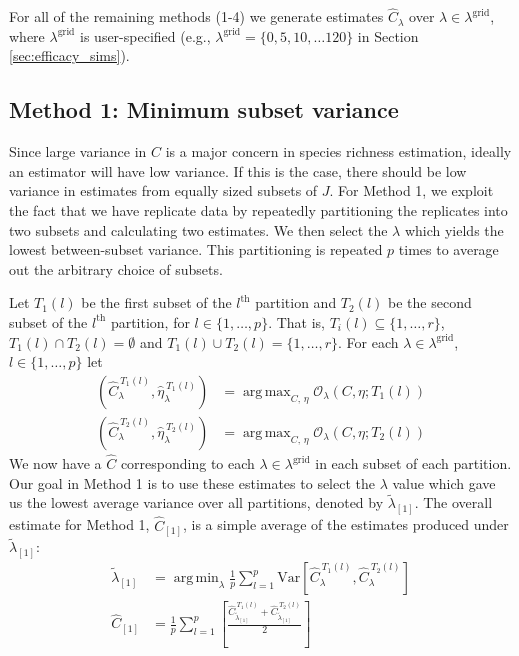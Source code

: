 \documentclass[12pt]{article}
\DeclareMathOperator*{\argmin}{arg\,min}
\DeclareMathOperator*{\argmax}{arg\,max}
\newcommand{\lambdagrid}{\lambda^{\text{grid}}}
\begin{document}
For all of the remaining methods (1-4) we generate estimates $\widehat{C}_\lambda$ over $\lambda \in \lambda^{\text{grid}}$, where $\lambdagrid$ is user-specified (e.g., $\lambdagrid = \{0, 5, 10, \dots 120\}$ in Section \ref{sec:efficacy_sims}).  %

%
%
\subsection{Method 1: Minimum subset variance}

Since large variance in $C$ is a major concern in species richness estimation, ideally an estimator will have low variance. If this is the case, there should be low variance in estimates from equally sized subsets of $J$.
For Method 1, we exploit the fact that we have replicate data by repeatedly partitioning the replicates into two subsets and calculating two estimates.  We then select the $\lambda$ which yields the lowest between-subset variance.  This partitioning is repeated $p$ times to average out the arbitrary choice of subsets.


Let $T_1(l)$ be the first subset of the $l^{\text{th}}$ partition and $T_2(l)$ be the second subset of the $l^{\text{th}}$ partition, for $l \in \{1, \dots , p\}$. That is, $T_i(l) \subseteq \{1, \dots , r\}$, $T_1(l) \cap T_2(l) = \emptyset$ and $T_1(l) \cup T_2(l) = \{1, \dots ,r\}$.
For each $\lambda \in \lambda^{\text{grid}}$, $l \in \{1, \dots, p\}$ let
\begin{align}
\left(\widehat{C}_{\lambda}^{ \ T_1(l)}, \widehat{\eta}_{\lambda}^{ \ T_1(l)} \right) &= \argmax_{C, \, \eta} \mathcal{O}_\lambda \left(C, \eta; T_1(l) \right) \\
\left(\widehat{C}_{\lambda}^{ \ T_2(l)}, \widehat{\eta}_{\lambda}^{ \ T_2(l)} \right) &= \argmax_{C, \, \eta} \mathcal{O}_\lambda \left(C, \eta; T_2(l) \right)
\end{align}
We now have a $\widehat{C}$ corresponding to each $\lambda \in \lambdagrid$ in each subset of each partition.  Our goal in Method 1 is to use these estimates to select the $\lambda$ value which gave us the lowest average variance over all partitions, denoted by $\widetilde{\lambda}_{[1]}$.  The overall estimate for Method 1, $\widehat{C}_{[1]}$, is a simple average of the estimates produced under $\widetilde{\lambda}_{[1]}$:
\begin{align}
\widetilde{\lambda}_{[1]} &= \argmin_{\lambda} \frac{1}{p} \sum_{l=1}^p \text{Var}\left[ \widehat{C}_{\lambda}^{ \ T_1(l)}, \widehat{C}_{\lambda}^{ \ T_2(l)} \right] \\
\widehat{C}_{[1]} &=  \frac{1}{p} \sum_{l=1}^p \left[ \frac{\widehat{C}_{\widetilde{\lambda}_{[1]}}^{ \ T_1(l)} + \widehat{C}_{\widetilde{\lambda}_{[1]}}^{ \ T_2(l)}}{2} \right]
\end{align}
\end{document}
